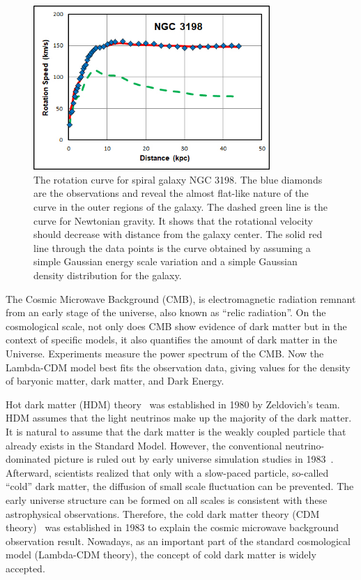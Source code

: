 \begin{figure}[htbp]
    \centering
    \includegraphics[width=0.8\textwidth]{chapters/c2/figures/ngc3198_sparc.jpg}
    \caption{The rotation curve for spiral galaxy NGC 3198. The blue diamonds are the observations and reveal the almost flat-like nature of the curve in the outer regions of the galaxy. The dashed green line is the curve for Newtonian gravity. It shows that the rotational velocity should decrease with distance from the galaxy center. The solid red line through the data points is the curve obtained by assuming a simple Gaussian energy scale variation and a simple Gaussian density distribution for the galaxy.}
    \label{fig:rotation}
\end{figure}

\par The Cosmic Microwave Background (CMB), is electromagnetic radiation remnant from an early stage of the universe, also known as ``relic radiation''. On the cosmological scale, not only does CMB show evidence of dark matter but in the context of specific models, it also quantifies the amount of dark matter in the Universe. Experiments measure the power spectrum of the CMB. Now the Lambda-CDM model best fits the observation data, giving values for the density of baryonic matter, dark matter, and Dark Energy.

\par Hot dark matter (HDM) theory~\cite{Zeldovich:1982zz} was established in 1980 by Zeldovich's team. HDM assumes that the light neutrinos make up the majority of the dark matter. It is natural to assume that the dark matter is the weakly coupled particle that already exists in the Standard Model. However, the conventional neutrino-dominated picture is ruled out by early universe simulation studies in 1983~\cite{White:1984yj}. Afterward, scientists realized that only with a slow-paced particle, so-called ``cold'' dark matter, the diffusion of small scale fluctuation can be prevented. The early universe structure can be formed on all scales is consistent with these astrophysical observations. Therefore, the cold dark matter theory (CDM theory)~\cite{PhysRevLett.48.223} was established in 1983 to explain the cosmic microwave background observation result. Nowadays, as an important part of the standard cosmological model (Lambda-CDM theory), the concept of cold dark matter is widely accepted. 

